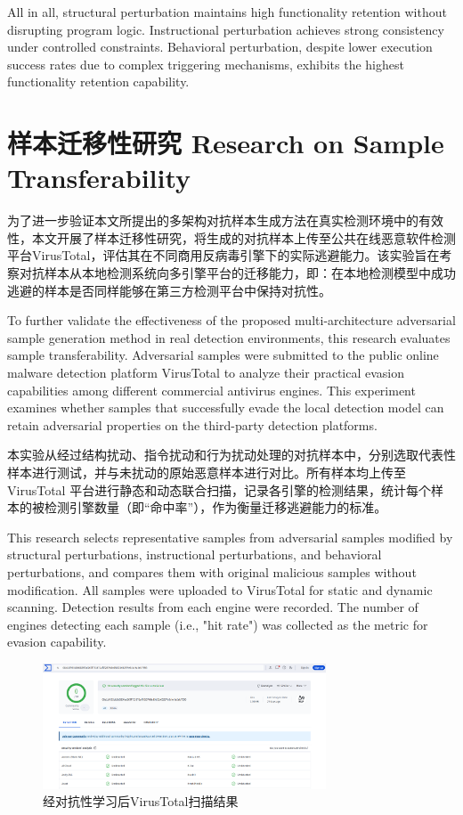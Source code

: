 All in all, structural perturbation maintains high functionality retention without disrupting program logic. Instructional perturbation achieves strong consistency under controlled constraints. Behavioral perturbation, despite lower execution success rates due to complex triggering mechanisms, exhibits the highest functionality retention capability.

\section{样本迁移性研究 Research on Sample Transferability}

为了进一步验证本文所提出的多架构对抗样本生成方法在真实检测环境中的有效性，本文开展了样本迁移性研究，将生成的对抗样本上传至公共在线恶意软件检测平台VirusTotal，评估其在不同商用反病毒引擎下的实际逃避能力。该实验旨在考察对抗样本从本地检测系统向多引擎平台的迁移能力，即：在本地检测模型中成功逃避的样本是否同样能够在第三方检测平台中保持对抗性。

To further validate the effectiveness of the proposed multi-architecture adversarial sample generation method in real detection environments, this research evaluates sample transferability. Adversarial samples were submitted to the public online malware detection platform VirusTotal to analyze their practical evasion capabilities among different commercial antivirus engines. This experiment examines whether samples that successfully evade the local detection model can retain adversarial properties on the third-party detection platforms.

本实验从经过结构扰动、指令扰动和行为扰动处理的对抗样本中，分别选取代表性样本进行测试，并与未扰动的原始恶意样本进行对比。所有样本均上传至 VirusTotal 平台进行静态和动态联合扫描，记录各引擎的检测结果，统计每个样本的被检测引擎数量（即“命中率”），作为衡量迁移逃避能力的标准。

This research selects representative samples from adversarial samples modified by structural perturbations, instructional perturbations, and behavioral perturbations, and compares them with original malicious samples without modification. All samples were uploaded to VirusTotal for static and dynamic scanning. Detection results from each engine were recorded. The number of engines detecting each sample (i.e., "hit rate") was collected as the metric for evasion capability.

\begin{figure}[htbp]
	\centering
	\includegraphics[width=0.75\textwidth]{figures/5.3}
	\caption{经对抗性学习后VirusTotal扫描结果}\label{fig:5.3}
\end{figure}


